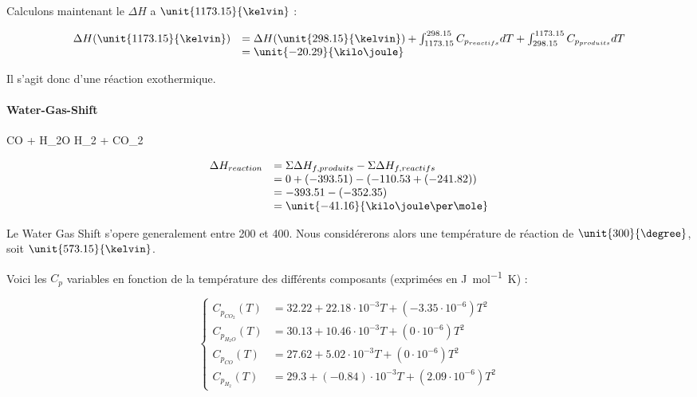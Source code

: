 Calculons maintenant le $\Delta H$ a $\unit{1173.15}{\kelvin}$ :

$$
	\begin{array}{rl}
		 	\Delta H(\unit{1173.15}{\kelvin}) &=  \Delta H(\unit{298.15}{\kelvin}) 
																						+ \int_{1173.15}^{298.15} C_{p_{reactifs}} dT + \int_{298.15}^{1173.15} 
																						C_{p_{produits}} dT \\
																				&=  \unit{-20.29}{\kilo\joule}
	\end{array}
$$	

Il s'agit donc d'une réaction exothermique.

\paragraph{Water-Gas-Shift}

\begin{chemmath}
		CO + H_2O \Longrightarrow H_2 + CO_2
\end{chemmath}	

$$
	\begin{array}{rl}
	\Delta H_{reaction}		&= \Sigma \Delta H_{f,produits} - \Sigma \Delta H_{f,reactifs} \\
												&= 0 + (-393.51) - (-110.53 + (-241.82)) \\
												&= -393.51 - (-352.35) \\
												&= \unit{-41.16}{\kilo\joule\per\mole}
	\end{array}
$$

Le Water Gas Shift s'opere generalement entre 200 et \unit{400}{\degree}. Nous considérerons
alors une température de réaction de $\unit{300}{\degree}$, soit $\unit{573.15}{\kelvin}$.
						
Voici les $C_{p}$ variables en fonction de la température des différents composants\cite{hc-table}
(exprimées en \unit{\joule\per\mole\kelvin}) :

$$
	\left\{
		\begin{array}{rl}
			C_{p_{CO_{2}}}(T) &= 32.22 + 22.18\cdot10^{-3}T + (-3.35\cdot10^{-6})T^2\\
			C_{p_{H_2O}}(T)		&= 30.13 + 10.46\cdot10^{-3}T + (0\cdot10^{-6})T^2\\
			C_{p_{CO}}(T) 		&= 27.62 + 5.02\cdot10^{-3}T + (0\cdot10^{-6})T^2 \\
			C_{p_{H_2}}(T) 		&= 29.3 + (-0.84)\cdot10^{-3}T + (2.09\cdot10^{-6})T^2
		\end{array}
	\right.
$$
					
